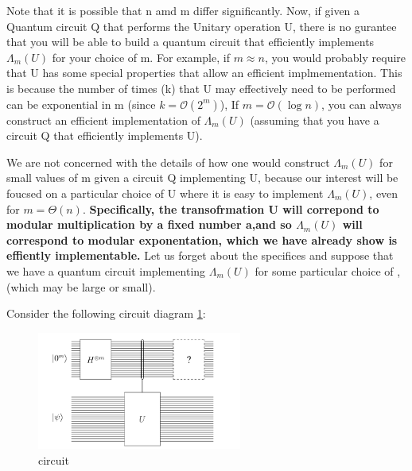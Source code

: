 \documentclass[12pt, oneside]{book}
\theoremstyle{definition}
\theoremstyle{definition}
\theoremstyle{remark}
\begin{document}
\begin{importantnote}
    Note that it is possible that n amd m differ significantly. Now, if 
    given a Quantum circuit Q that performs the Unitary operation U, there is no gurantee that you will be able to build a quantum circuit that 
    efficiently implements $\Lambda_m(U)$ for your choice of m. For example, if $m \approx n$, you would probably require that U has some special properties that allow an efficient implmementation. This is because the number of times (k) 
    that U may effectively need to be performed can be exponential in m (since $k=\mathcal{O}(2^m)$),
    If $m=\mathcal{O}(\log n)$, you can always construct an efficient implementation of $\Lambda_m(U)$ (assuming that you have a circuit Q that efficiently implements U).
    
    We are not concerned with the details of how one would construct $\Lambda_m(U)$ for small values of m given a circuit Q implementing U,
    because our interest will be foucsed on a particular choice of U where it is easy to implement $\Lambda_m(U)$, even for $m=\Theta(n)$.
    \textbf{Specifically, the transofrmation U will correpond to modular multiplication by a fixed number a,and so $\Lambda_m(U)$ will correspond to modular exponentation, which we have already show is effiently implementable.}
    Let us forget about the specifices and suppose that we have a quantum circuit implementing $\Lambda_m(U)$ for some particular choice of , (which may be large or small).
\end{importantnote}

Consider the following circuit diagram \ref{fig:phaseestimation2}:
\begin{figure}[H]
    \centering
    \includegraphics[width=0.6\textwidth]{../images/phaseest2.png}
    \caption{circuit}
    \label{fig:phaseestimation2}
\end{figure}
\end{document}
